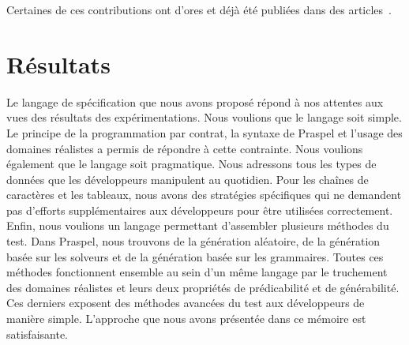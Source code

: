 Certaines de ces contributions ont d'ores et déjà été publiées dans des
articles~.

\section{Résultats}

Le langage de spécification que nous avons proposé répond à nos attentes aux
vues des résultats des expérimentations. Nous voulions que le langage soit
simple. Le principe de la programmation par contrat, la syntaxe de Praspel et
l'usage des domaines réalistes a permis de répondre à cette contrainte. Nous
voulions également que le langage soit pragmatique. Nous adressons tous les
types de données que les développeurs manipulent au quotidien. Pour les chaînes
de caractères et les tableaux, nous avons des stratégies spécifiques qui ne
demandent pas d'efforts supplémentaires aux développeurs pour être utilisées
correctement. Enfin, nous voulions un langage permettant d'assembler plusieurs
méthodes du test. Dans Praspel, nous trouvons de la génération aléatoire, de la
génération basée sur les solveurs et de la génération basée sur les grammaires.
Toutes ces méthodes fonctionnent ensemble au sein d'un même langage par le
truchement des domaines réalistes et leurs deux propriétés de prédicabilité et
de générabilité. Ces derniers exposent des méthodes avancées du test aux
développeurs de manière simple. L'approche que nous avons présentée dans ce
mémoire est satisfaisante.
